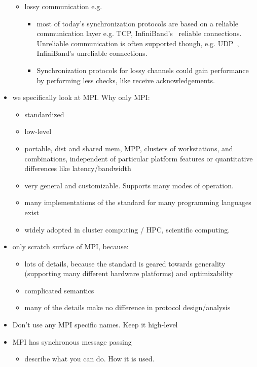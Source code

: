 \documentclass[a4paper, 10pt]{article}
\begin{document}
\begin{itemize}
\begin{itemize}
			\item lossy communication e.g.
				\begin{itemize}
					\item most of today's synchronization protocols are based on a reliable communication layer e.g. TCP, InfiniBand's~\cite{infiniband} reliable connections. Unreliable communication is often supported though, e.g. UDP~\cite{udp}, InfiniBand's unreliable connections.
					\item Synchronization protocols for lossy channels could gain performance by performing less checks, like receive acknowledgements.
				\end{itemize}
		\end{itemize}
	\label{why-only-mpi}
	\item we specifically look at MPI\cite{mpi}. Why only MPI:
		\begin{itemize}
			\item standardized
			\item low-level
			\item portable, dist and shared mem, MPP, clusters of workstations, and combinations, independent of particular platform features or quantitative differences like latency/bandwidth
			\item very general and customizable. Supports many modes of operation.
			\item many implementations of the standard for many programming languages exist
			\item widely adopted in cluster computing / HPC, scientific computing.~\cite{mpiadoptiona, mpiadoptionb, mpiadoptionc}
		\end{itemize}
	\item only scratch surface of MPI, because:
		\begin{itemize}
			\item lots of details, because the standard is geared towards generality (supporting many different hardware platforms) and optimizability
			\item complicated semantics
			\item many of the details make no difference in protocol design/analysis
		\end{itemize}
	\item Don't use any MPI specific names. Keep it high-level
	\item MPI has synchronous message passing
		\begin{itemize}
			\item describe what you can do. How it is used.

\end{itemize}
\end{itemize}
\end{document}

